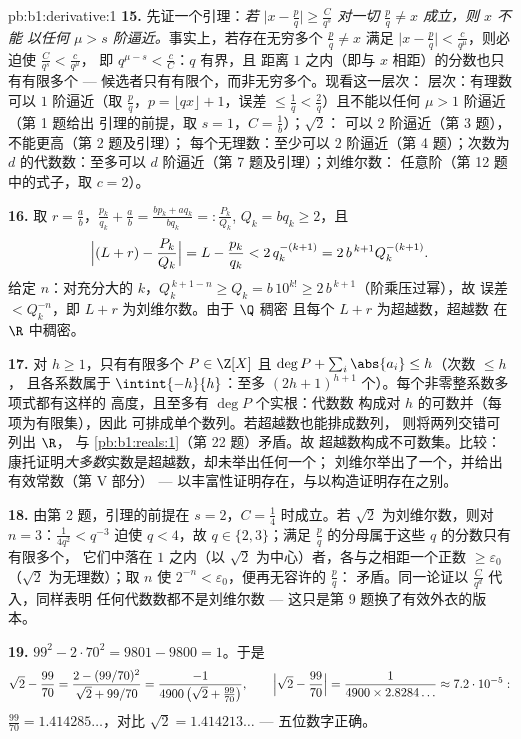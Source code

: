 \begin{solution}{pb:b1:derivative:1}
\textbf{15.} 先证一个引理：\emph{若 $\bigl|x - \frac pq\bigr|
\geq \frac{C}{q^s}$ 对一切 $\frac pq \neq x$ 成立，则 $x$ 不能
以任何 $\mu > s$ 阶逼近。}事实上，若存在无穷多个
$\frac pq \neq x$ 满足 $\bigl|x - \frac pq\bigr| <
\frac{c}{q^\mu}$，则必迫使 $\frac{C}{q^s} < \frac{c}{q^\mu}$，
即 $q^{\mu - s} < \frac cC$：$q$ 有界，且
距离 $1$ 之内（即与 $x$ 相距）的分数也只有有限多个 ---
候选者只有有限个，而非无穷多个。现看这一层次：
层次：有理数可以 $1$ 阶逼近（取 $\frac
pq$，$p = \lfloor qx\rfloor + 1$，误差 $\leq \frac1q <
\frac2q$）且不能以任何 $\mu > 1$ 阶逼近（第 1 题给出
引理的前提，取 $s = 1$，$C = \frac1b$）；$\sqrt2$：
可以 $2$ 阶逼近（第 3 题），不能更高（第 2 题及引理）；
每个无理数：至少可以 $2$ 阶逼近（第 4 题）；次数为
$d$ 的代数数：至多可以 $d$ 阶逼近（第 7 题及引理）；刘维尔数：
任意阶（第 12 题中的式子，取 $c = 2$）。

\textbf{16.} 取 $r = \frac ab$，$\frac{p_k}{q_k} + \frac ab =
\frac{b p_k + a q_k}{b q_k} =: \frac{P_k}{Q_k}$, $Q_k = b q_k
\geq 2$，且
\[
\Bigl|(L + r) - \frac{P_k}{Q_k}\Bigr| = L - \frac{p_k}{q_k}
< 2\,q_k^{-(k+1)} = 2\,b^{\,k+1} Q_k^{-(k+1)} .
\]
给定 $n$：对充分大的 $k$，$Q_k^{\,k+1-n} \geq Q_k = b\,10^{k!}
\geq 2\,b^{\,k+1}$（阶乘压过幂），故
误差 $< Q_k^{-n}$，即 $L + r$ 为刘维尔数。由于 $\Q$ 稠密
且每个 $L + r$ 为超越数，超越数
在 $\R$ 中稠密。

\textbf{17.} 对 $h \geq 1$，只有有限多个 $P \in
\Z[X]$ 且 $\deg P + \sum_i \abs{a_i} \leq h$（次数 $\leq h$，
且各系数属于 $\intint{-h}{h}$：至多
$(2h+1)^{h+1}$ 个）。每个非零整系数多项式都有这样的
高度，且至多有 $\deg P$ 个实根：代数数
构成对 $h$ 的可数并（每项为有限集），因此
可排成单个数列。若超越数也能排成数列，
则将两列交错可列出 $\R$，
与 \cref{pb:b1:reals:1}（第 22 题）矛盾。故
超越数构成不可数集。比较：
康托证明\emph{大多数}实数是超越数，却未举出任何一个；
刘维尔举出了一个，并给出有效常数（第 V 部分）
--- 以丰富性证明存在，与以构造证明存在之别。

\textbf{18.} 由第 2 题，引理的前提在 $s
= 2$，$C = \frac14$ 时成立。若 $\sqrt2$ 为刘维尔数，则对 $n =
3$：$\frac{1}{4q^2} < q^{-3}$ 迫使 $q < 4$，故 $q \in \{2,
3\}$；满足 $\frac pq$ 的分母属于这些 $q$ 的分数只有有限多个，
它们中落在 $1$ 之内（以 $\sqrt2$ 为中心）者，各与之相距一个正数
$\geq \varepsilon_0$（$\sqrt2$ 为无理数）；取 $n$ 使
$2^{-n} < \varepsilon_0$，便再无容许的 $\frac pq$：
矛盾。同一论证以 $\frac{C}{q^d}$ 代入，同样表明
任何代数数都不是刘维尔数 ---
这只是第 9 题换了有效外衣的版本。

\textbf{19.} $99^2 - 2\cdot70^2 = 9801 - 9800 = 1$。于是
\[
\sqrt2 - \frac{99}{70} =
\frac{2 - (99/70)^2}{\sqrt2 + 99/70}
= \frac{-1}{4900\,\bigl(\sqrt2 + \tfrac{99}{70}\bigr)} ,
\qquad
\Bigl|\sqrt2 - \frac{99}{70}\Bigr|
= \frac{1}{4900 \times 2.8284\dots} \approx 7.2\cdot10^{-5} :
\]
$\frac{99}{70} = 1.414285\dots$，对比 $\sqrt2 =
1.414213\dots$ --- 五位数字正确。


\end{solution}
